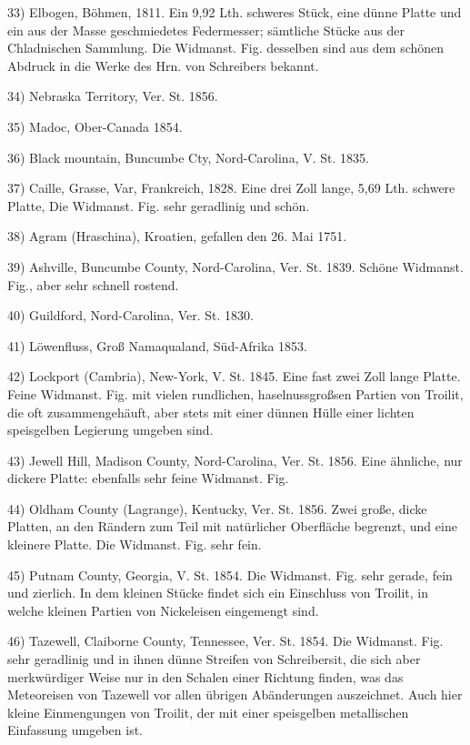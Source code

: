 \documentclass[a4paper, 11pt, oneside]{article}
\begin{document}
33) Elbogen, Böhmen, 1811. Ein 9,92 Lth. schweres Stück, eine dünne Platte und ein aus der Masse geschmiedetes Federmesser; sämtliche Stücke aus der Chladnischen Sammlung. Die Widmanst. Fig. desselben sind aus dem schönen Abdruck in die Werke des Hrn. von Schreibers bekannt.

34) Nebraska Territory, Ver. St. 1856.

35) Madoc, Ober-Canada 1854.

36) Black mountain, Buncumbe Cty, Nord-Carolina, V. St. 1835.

37) Caille, Grasse, Var, Frankreich, 1828. Eine drei Zoll lange, 5,69 Lth. schwere Platte, Die Widmanst. Fig. sehr geradlinig und schön.

38) Agram (Hraschina), Kroatien, gefallen den 26. Mai 1751.

39) Ashville, Buncumbe County, Nord-Carolina, Ver. St. 1839. Schöne Widmanst. Fig., aber sehr schnell rostend.

40) Guildford, Nord-Carolina, Ver. St. 1830.

41) Löwenfluss, Groß Namaqualand, Süd-Afrika 1853.

42) Lockport (Cambria), New-York, V. St. 1845. Eine fast zwei Zoll lange Platte. Feine Widmanst. Fig. mit vielen rundlichen, haselnussgroßsen Partien von Troilit, die oft zusammengehäuft, aber stets mit einer dünnen Hülle einer lichten speisgelben Legierung umgeben sind.

43) Jewell Hill, Madison County, Nord-Carolina, Ver. St. 1856. Eine ähnliche, nur dickere Platte: ebenfalls sehr feine Widmanst. Fig.

44) Oldham County (Lagrange), Kentucky, Ver. St. 1856. Zwei große, dicke Platten, an den Rändern zum Teil mit natürlicher Oberfläche begrenzt, und eine kleinere Platte. Die Widmanst. Fig. sehr fein.

45) Putnam County, Georgia, V. St. 1854. Die Widmanst. Fig. sehr gerade, fein und zierlich. In dem kleinen Stücke findet sich ein Einschluss von Troilit, in welche kleinen Partien von Nickeleisen eingemengt sind.

46) Tazewell, Claiborne County, Tennessee, Ver. St. 1854. Die Widmanst. Fig. sehr geradlinig und in ihnen dünne Streifen von Schreibersit, die sich aber merkwürdiger Weise nur in den Schalen einer Richtung finden, was das Meteoreisen von Tazewell vor allen übrigen Abänderungen auszeichnet. Auch hier kleine Einmengungen von Troilit, der mit einer speisgelben metallischen Einfassung umgeben ist.
\vspace{\medskipamount}
\end{document}
